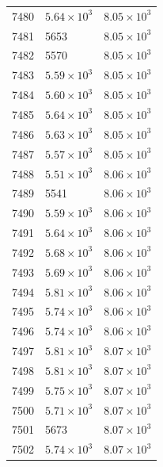 \begin{table}[H]
\begin{tabular}{lll}
7480 & $\displaystyle 5.64 \times 10^{3}$ & $\displaystyle 8.05 \times 10^{3}$ \\
7481 & 5653 & $\displaystyle 8.05 \times 10^{3}$ \\
7482 & 5570 & $\displaystyle 8.05 \times 10^{3}$ \\
7483 & $\displaystyle 5.59 \times 10^{3}$ & $\displaystyle 8.05 \times 10^{3}$ \\
7484 & $\displaystyle 5.60 \times 10^{3}$ & $\displaystyle 8.05 \times 10^{3}$ \\
7485 & $\displaystyle 5.64 \times 10^{3}$ & $\displaystyle 8.05 \times 10^{3}$ \\
7486 & $\displaystyle 5.63 \times 10^{3}$ & $\displaystyle 8.05 \times 10^{3}$ \\
7487 & $\displaystyle 5.57 \times 10^{3}$ & $\displaystyle 8.05 \times 10^{3}$ \\
7488 & $\displaystyle 5.51 \times 10^{3}$ & $\displaystyle 8.06 \times 10^{3}$ \\
7489 & 5541 & $\displaystyle 8.06 \times 10^{3}$ \\
7490 & $\displaystyle 5.59 \times 10^{3}$ & $\displaystyle 8.06 \times 10^{3}$ \\
7491 & $\displaystyle 5.64 \times 10^{3}$ & $\displaystyle 8.06 \times 10^{3}$ \\
7492 & $\displaystyle 5.68 \times 10^{3}$ & $\displaystyle 8.06 \times 10^{3}$ \\
7493 & $\displaystyle 5.69 \times 10^{3}$ & $\displaystyle 8.06 \times 10^{3}$ \\
7494 & $\displaystyle 5.81 \times 10^{3}$ & $\displaystyle 8.06 \times 10^{3}$ \\
7495 & $\displaystyle 5.74 \times 10^{3}$ & $\displaystyle 8.06 \times 10^{3}$ \\
7496 & $\displaystyle 5.74 \times 10^{3}$ & $\displaystyle 8.06 \times 10^{3}$ \\
7497 & $\displaystyle 5.81 \times 10^{3}$ & $\displaystyle 8.07 \times 10^{3}$ \\
7498 & $\displaystyle 5.81 \times 10^{3}$ & $\displaystyle 8.07 \times 10^{3}$ \\
7499 & $\displaystyle 5.75 \times 10^{3}$ & $\displaystyle 8.07 \times 10^{3}$ \\
7500 & $\displaystyle 5.71 \times 10^{3}$ & $\displaystyle 8.07 \times 10^{3}$ \\
7501 & 5673 & $\displaystyle 8.07 \times 10^{3}$ \\
7502 & $\displaystyle 5.74 \times 10^{3}$ & $\displaystyle 8.07 \times 10^{3}$ \\

\end{tabular}
\end{table}

